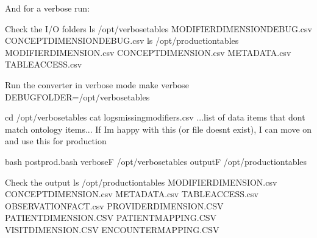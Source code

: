 \documentclass[letterpaper,10pt,english]{sphinxmanual}
\begin{document}
And for a verbose run:
\def\sphinxLiteralBlockLabel{\label{\detokenize{run_data:id2}}}
%
\begin{sphinxVerbatim}[commandchars=\\\{\}]
\PYGZsh{} Check the I/O folders
\PYGZdl{} ls /opt/verbose\PYGZus{}tables
        MODIFIER\PYGZus{}DIMENSION\PYGZus{}DEBUG.csv CONCEPT\PYGZus{}DIMENSION\PYGZus{}DEBUG.csv
\PYGZdl{} ls /opt/production\PYGZus{}tables
        MODIFIER\PYGZus{}DIMENSION.csv CONCEPT\PYGZus{}DIMENSION.csv METADATA.csv TABLE\PYGZus{}ACCESS.csv

\PYGZsh{} Run the converter in verbose mode
\PYGZdl{} make verbose DEBUG\PYGZus{}FOLDER=/opt/verbose\PYGZus{}tables

\PYGZdl{} cd /opt/verbose\PYGZus{}tables
\PYGZdl{} cat logs\PYGZus{}missing\PYGZus{}modifiers.csv
        ...\PYGZlt{}list of data items that don\PYGZsq{}t match ontology items\PYGZgt{}...
\PYGZsh{} If I\PYGZsq{}m happy with this (or file doesn\PYGZsq{}t exist), I can move on and use this for production

\PYGZdl{} bash postprod.bash \PYGZhy{}verboseF /opt/verbose\PYGZus{}tables \PYGZhy{}outputF /opt/production\PYGZus{}tables

\PYGZsh{} Check the output
\PYGZdl{} ls /opt/production\PYGZus{}tables
       MODIFIER\PYGZus{}DIMENSION.csv CONCEPT\PYGZus{}DIMENSION.csv
       METADATA.csv TABLE\PYGZus{}ACCESS.csv
       OBSERVATION\PYGZus{}FACT.csv PROVIDER\PYGZus{}DIMENSION.CSV
       PATIENT\PYGZus{}DIMENSION.CSV PATIENT\PYGZus{}MAPPING.CSV
       VISIT\PYGZus{}DIMENSION.CSV ENCOUNTER\PYGZus{}MAPPING.CSV
\end{sphinxVerbatim}
\sphinxresetverbatimhllines
\end{document}
